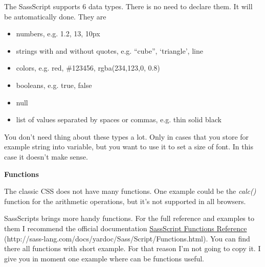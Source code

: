 \documentclass[a4paper,12pt,oneside,pdftex]{sphinxmanual}
\begin{document}
The SassScript supports 6 data types. There is no need to declare them. It will be automatically done. They are
\begin{itemize}
\item {} 
numbers, e.g. 1.2, 13, 10px

\item {} 
strings with and without quotes, e.g. ``cube'', `triangle', line

\item {} 
colors, e.g. red, \#123456, rgba(234,123,0, 0.8)

\item {} 
booleans, e.g. true, false

\item {} 
null

\item {} 
list of values separated by spaces or commas, e.g. thin solid black

\end{itemize}

You don't need thing about these types a lot. Only in cases that you store for example string into variable, but you want to use it to set a size of font. In this case it doesn't make sense.

\textbf{Functions}

The classic CSS does not have many functions. One example could be the \emph{calc()} function for the arithmetic operations, but it's not supported in all browsers.

SassScripts brings more handy functions. For the full reference and examples to them I recommend the official documentation \href{http://sass-lang.com/docs/yardoc/Sass/Script/Functions.html}{SassScript Functions Reference} (http://sass-lang.com/docs/yardoc/Sass/Script/Functions.html). You can find there all functions with short example. For that reason I'm not going to copy it. I give you in moment one example where can be functions useful.
\end{document}
